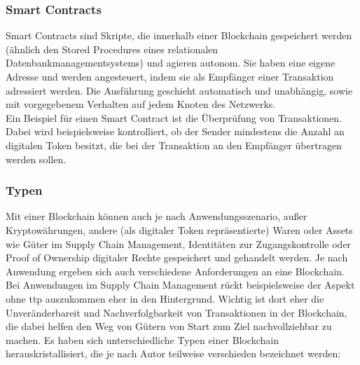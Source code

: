     \subsubsection{Smart Contracts}
    \label{sec:sota_blockchain_sc}
        Smart Contracts sind Skripte, die innerhalb einer Blockchain gespeichert werden (ähnlich den Stored Procedures eines relationalen Datenbankmanagementsystems) und agieren autonom. 
        Sie haben eine eigene Adresse und werden angesteuert, indem sie als Empfänger einer Transaktion adressiert werden.
        Die Ausführung geschieht automatisch und unabhängig, sowie mit vorgegebenem Verhalten auf jedem Knoten des Netzwerks.\cite{Christidis2016}
        \medskip\\
        Ein Beispiel für einen Smart Contract ist die Überprüfung von Transaktionen. 
        Dabei wird beispielsweise kontrolliert, ob der Sender mindestens die Anzahl an digitalen Token besitzt, die bei der Transaktion an den Empfänger übertragen werden sollen.
    
    \subsubsection{Typen}
    \label{sec:sota_blockchain_types}
        Mit einer Blockchain können auch je nach Anwendungsszenario, außer Kryptowährungen, andere (als digitaler Token repräsentierte) Waren oder Assets wie Güter im Supply Chain Management\cite{Underwood2016}, Identitäten zur Zugangskontrolle\cite{Kshetri2017} oder Proof of Ownership digitaler Rechte\cite{Wuest2017} gespeichert und gehandelt werden. 
        Je nach Anwendung ergeben sich auch verschiedene Anforderungen an eine Blockchain. 
        Bei Anwendungen im Supply Chain Management rückt beispielsweise der Aspekt ohne \gls{ttp} auszukommen eher in den Hintergrund. 
        Wichtig ist dort eher die Unveränderbareit und Nachverfolgbarkeit von Transaktionen in der Blockchain, die dabei helfen den Weg von Gütern von Start zum Ziel nachvollziehbar zu machen. 
        \newpage
        \indent Es haben sich unterschiedliche Typen einer Blockchain herauskristallisiert, die je nach Autor teilweise verschieden bezeichnet werden\cite{Wuest2017,Christidis2016,Buterin2015,Vukolic2017}:
        
